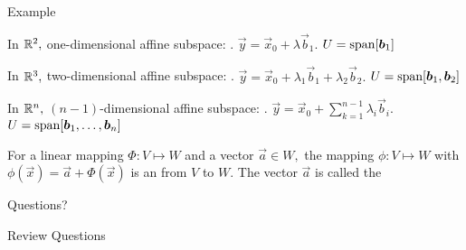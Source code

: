 \documentclass[handout,fleqn,aspectratio=169]{beamer}
\begin{document}
\begin{frame}{Example}

\small
\plitemsep 0.05in
\bci 
\item In ${\mathbb R}^2,$ one-dimensional affine subspace: . $\vec{y} = \vec{x}_0 + \lambda \vec{b}_1.$ $U = \text{span}[\bm{b}_1]$

\item In ${\mathbb R}^3,$ two-dimensional affine subspace: . $\vec{y} = \vec{x}_0 + \lambda_1 \vec{b}_1 + \lambda_2 \vec{b}_2.$ $U = \text{span}[\bm{b}_1, \bm{b}_2]$

\item In ${\mathbb R}^n,$ $(n-1)$-dimensional affine subspace: . $\vec{y} = \vec{x}_0 + \sum_{k=1}^{n-1} \lambda_i \vec{b}_i.$ $U = \text{span}[\bm{b}_1, \ldots, \bm{b}_n]$

\medskip
\begin{center}
\end{center}

\item For a linear mapping $\Phi: V \mapsto W$ and a vector $\vec{a} \in W,$ the mapping $\phi: V \mapsto W$ with $\phi(\vec{x}) = \vec{a} + \Phi(\vec{x})$ is an  from $V$ to $W.$ The vector $\vec{a}$ is called the 
\eci


\end{frame}


\begin{frame}{}
\vspace{2cm}
\LARGE Questions?


\end{frame}

\begin{frame}{Review Questions}
\bce[1)]
\item 

\ece
\end{frame}
\end{document}
